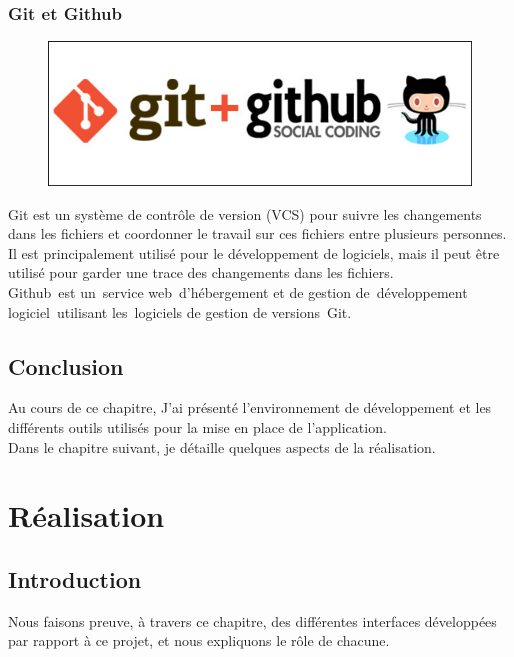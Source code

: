 \documentclass[12pt,a4paper]{report}
\begin{document}
		\subsection{Git et Github}
		\begin{figure}
		\includegraphics[scale=0.25]{./graphics/gitgithub.jpg}
		\end{figure}
		Git est un système de contrôle de version (VCS) pour suivre les changements dans les fichiers et coordonner le travail sur ces fichiers entre plusieurs personnes. Il est principalement utilisé pour le développement de logiciels, mais il peut être utilisé pour garder une trace des changements dans les fichiers.\\
Github est un service web d'hébergement et de gestion de développement logiciel utilisant les logiciels de gestion de versions Git.


		\section{Conclusion}
Au cours de ce chapitre, J'ai présenté l’environnement de développement et les différents outils utilisés pour la mise en place de l’application.\\
Dans le chapitre suivant, je détaille quelques aspects de la réalisation.













	\chapter{Réalisation}

	\section{Introduction}
Nous faisons preuve, à travers ce chapitre, des différentes interfaces développées par rapport
à ce projet, et nous expliquons le rôle de chacune.
\end{document}
